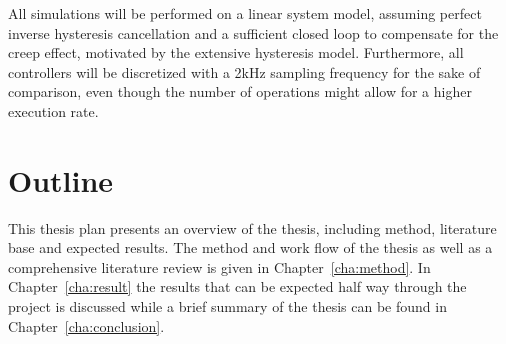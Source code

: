 All simulations will be performed on a linear system model, assuming perfect inverse hysteresis cancellation and a sufficient closed loop to compensate for the creep effect, motivated by the extensive hysteresis model. Furthermore, all controllers will be discretized with a 2kHz sampling frequency for the sake of comparison, even though the number of operations might allow for a higher execution rate.

\section{Outline}
This thesis plan presents an overview of the thesis, including method, literature base and expected results. The method and work flow of the thesis as well as a comprehensive literature review is given in Chapter~\ref{cha:method}. In Chapter~\ref{cha:result} the results that can be expected half way through the project is discussed while a brief summary of the thesis can be found in Chapter~\ref{cha:conclusion}.
